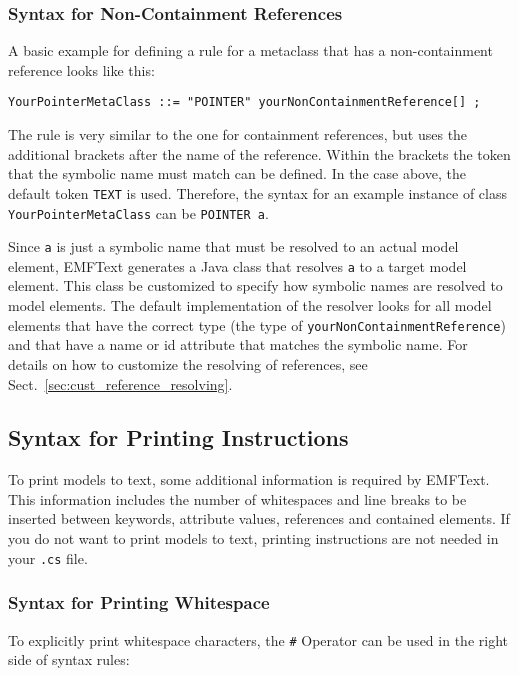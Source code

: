 \subsubsection{Syntax for Non-Containment References}

A basic example for defining a rule for a metaclass that has a non-containment 
reference looks like this:

\begin{lstlisting}
YourPointerMetaClass ::= "POINTER" yourNonContainmentReference[] ;
\end{lstlisting}

The rule is very similar to the one for containment references, but uses the 
additional brackets after the name of the reference. Within the brackets 
the token that the symbolic name must match can be defined. In the case above,
the default token \texttt{TEXT} is used. Therefore, the syntax for an example
instance of class \texttt{YourPointerMetaClass} can be \texttt{POINTER a}.

Since \texttt{a} is just a symbolic name that must be resolved to an actual 
model element, EMFText generates a Java class that resolves \texttt{a} to a 
target model element. This class be customized to specify how symbolic names are
resolved to model elements. The default implementation of the resolver looks 
for all model elements that have the correct type (the type of
\texttt{yourNonContainmentReference}) and that have a
name or id attribute that matches the symbolic name. For details on how to
customize the resolving of references, see
Sect.~\ref{sec:cust_reference_resolving}.

\subsection{Syntax for Printing Instructions}

To print models to text, some additional information is required by EMFText. 
This information includes the number of whitespaces and line breaks to be 
inserted between keywords, attribute values, references and contained elements. 
If you do not want to print models to text, printing instructions are not needed 
in your \texttt{.cs} file.

\subsubsection{Syntax for Printing Whitespace}

To explicitly print whitespace characters, the \texttt{\#} Operator can be used
in the right side of syntax rules:

